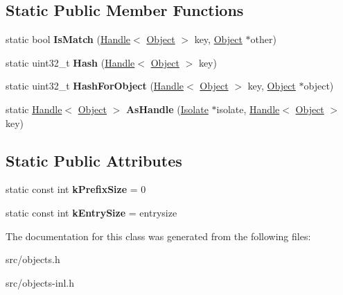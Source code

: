 \subsection*{Static Public Member Functions}
\begin{DoxyCompactItemize}
\item 
\hypertarget{classv8_1_1internal_1_1_weak_hash_table_shape_ad64e199f5d82a7f407ce25469cf0ded1}{}static bool {\bfseries Is\+Match} (\hyperlink{classv8_1_1internal_1_1_handle}{Handle}$<$ \hyperlink{classv8_1_1internal_1_1_object}{Object} $>$ key, \hyperlink{classv8_1_1internal_1_1_object}{Object} $\ast$other)\label{classv8_1_1internal_1_1_weak_hash_table_shape_ad64e199f5d82a7f407ce25469cf0ded1}

\item 
\hypertarget{classv8_1_1internal_1_1_weak_hash_table_shape_a0ce582647bdd7c4fbad02da93feb1cfe}{}static uint32\+\_\+t {\bfseries Hash} (\hyperlink{classv8_1_1internal_1_1_handle}{Handle}$<$ \hyperlink{classv8_1_1internal_1_1_object}{Object} $>$ key)\label{classv8_1_1internal_1_1_weak_hash_table_shape_a0ce582647bdd7c4fbad02da93feb1cfe}

\item 
\hypertarget{classv8_1_1internal_1_1_weak_hash_table_shape_a52b01f4039764355ff27d945d6664a62}{}static uint32\+\_\+t {\bfseries Hash\+For\+Object} (\hyperlink{classv8_1_1internal_1_1_handle}{Handle}$<$ \hyperlink{classv8_1_1internal_1_1_object}{Object} $>$ key, \hyperlink{classv8_1_1internal_1_1_object}{Object} $\ast$object)\label{classv8_1_1internal_1_1_weak_hash_table_shape_a52b01f4039764355ff27d945d6664a62}

\item 
\hypertarget{classv8_1_1internal_1_1_weak_hash_table_shape_a1425bba45891c4279438964ed61b29bc}{}static \hyperlink{classv8_1_1internal_1_1_handle}{Handle}$<$ \hyperlink{classv8_1_1internal_1_1_object}{Object} $>$ {\bfseries As\+Handle} (\hyperlink{classv8_1_1internal_1_1_isolate}{Isolate} $\ast$isolate, \hyperlink{classv8_1_1internal_1_1_handle}{Handle}$<$ \hyperlink{classv8_1_1internal_1_1_object}{Object} $>$ key)\label{classv8_1_1internal_1_1_weak_hash_table_shape_a1425bba45891c4279438964ed61b29bc}

\end{DoxyCompactItemize}
\subsection*{Static Public Attributes}
\begin{DoxyCompactItemize}
\item 
\hypertarget{classv8_1_1internal_1_1_weak_hash_table_shape_a06d4caf7eddf3598883ba5d38a5d3745}{}static const int {\bfseries k\+Prefix\+Size} = 0\label{classv8_1_1internal_1_1_weak_hash_table_shape_a06d4caf7eddf3598883ba5d38a5d3745}

\item 
\hypertarget{classv8_1_1internal_1_1_weak_hash_table_shape_ac214dc6d720864e019a4fa4fdfeaf6c9}{}static const int {\bfseries k\+Entry\+Size} = entrysize\label{classv8_1_1internal_1_1_weak_hash_table_shape_ac214dc6d720864e019a4fa4fdfeaf6c9}

\end{DoxyCompactItemize}


The documentation for this class was generated from the following files\+:\begin{DoxyCompactItemize}
\item 
src/objects.\+h\item 
src/objects-\/inl.\+h\end{DoxyCompactItemize}

